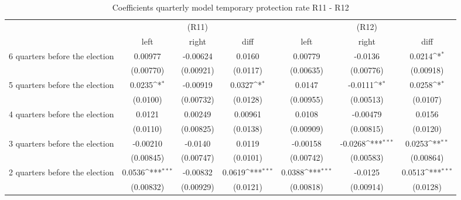 \begin{table}[!ht]\centering \footnotesize
\def\sym#1{\ifmmode^{#1}\else\(^{#1}\)\fi}
\caption{Coefficients quarterly model temporary protection rate R11 - R12}
\begin{tabular}{l*{6}{c}}
\hline\hline
                    &\multicolumn{3}{c}{(R11)}&\multicolumn{3}{c}{(R12)}\\
&\multicolumn{1}{c}{left}&\multicolumn{1}{c}{right}&\multicolumn{1}{c}{diff}&\multicolumn{1}{c}{left}&\multicolumn{1}{c}{right}&\multicolumn{1}{c}{diff}\\
\hline
 6 quarters before the election&     0.00977         &    -0.00624         &      0.0160         &     0.00779         &     -0.0136         &      0.0214\sym{*}  \\
                    &   (0.00770)         &   (0.00921)         &    (0.0117)         &   (0.00635)         &   (0.00776)         &   (0.00918)         \\
[0,5em]
 5 quarters before the election&      0.0235\sym{*}  &    -0.00919         &      0.0327\sym{*}  &      0.0147         &     -0.0111\sym{*}  &      0.0258\sym{*}  \\
                    &    (0.0100)         &   (0.00732)         &    (0.0128)         &   (0.00955)         &   (0.00513)         &    (0.0107)         \\
[0,5em]
 4 quarters before the election&      0.0121         &     0.00249         &     0.00961         &      0.0108         &    -0.00479         &      0.0156         \\
                    &    (0.0110)         &   (0.00825)         &    (0.0138)         &   (0.00909)         &   (0.00815)         &    (0.0120)         \\
[0,5em]
 3 quarters before the election&    -0.00210         &     -0.0140         &      0.0119         &    -0.00158         &     -0.0268\sym{***}&      0.0253\sym{**} \\
                    &   (0.00845)         &   (0.00747)         &    (0.0101)         &   (0.00742)         &   (0.00583)         &   (0.00864)         \\
[0,5em]
 2 quarters before the election&      0.0536\sym{***}&    -0.00832         &      0.0619\sym{***}&      0.0388\sym{***}&     -0.0125         &      0.0513\sym{***}\\
                    &   (0.00832)         &   (0.00929)         &    (0.0121)         &   (0.00818)         &   (0.00914)         &    (0.0128)         \\

\end{tabular}
\end{table}
